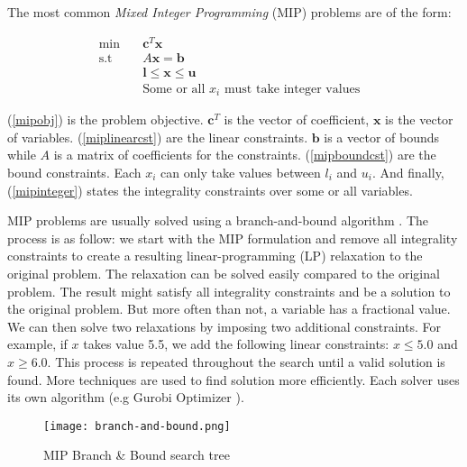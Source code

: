 \documentclass[../../thesis.tex]{subfiles}
\begin{document}
The most common \emph{Mixed Integer Programming} (MIP) problems are of the form:

\begin{align}
  \textrm{min} \quad & \bm{c}^T\bm{x} & \label{mipobj} \\ 
  \textrm{s.t} \quad & A\bm{x} = \bm{b} & \label{miplinearcst} \\
   & \bm{l} \leq \bm{x} \leq \bm{u} & \label{mipboundcst} \\
   & \text{Some or all $x_i$ must take integer values} \label{mipinteger}
\end{align}

(\ref{mipobj}) is the problem objective. $\bm{c}^T$ is the vector of coefficient, $\bm{x}$ is the vector of variables.
(\ref{miplinearcst}) are the linear constraints. $\bm{b}$ is a vector of bounds while $A$ is a matrix of coefficients for the constraints.
(\ref{mipboundcst}) are the bound constraints. Each $x_i$ can only take values between $l_i$ and $u_i$.
And finally, (\ref{mipinteger}) states the integrality constraints over some or all variables.


MIP problems are usually solved using a branch-and-bound algorithm \cite{mip-basics}.
The process is as follow: we start with the MIP formulation and remove all integrality constraints 
to create a resulting linear-programming (LP) relaxation to the original problem. The relaxation can be solved 
easily compared to the original problem. The result might satisfy all integrality constraints and be a solution to the original problem.
But more often than not, a variable has a fractional value.
We can then solve two relaxations by imposing two additional constraints. For example, if $x$ takes value 5.5, we add the 
following linear constraints: $x \leq 5.0$ and $x \geq 6.0$. 
This process is repeated throughout the search until a valid solution is found.
More techniques are used to find solution more efficiently. Each solver uses its
own algorithm (e.g Gurobi Optimizer \cite{mip-basics}).

\begin{figure}
  \centering
  \texttt{[image: branch-and-bound.png]}
  \caption{MIP Branch \& Bound search tree \cite{mip-basics}}
\end{figure}
\end{document}
